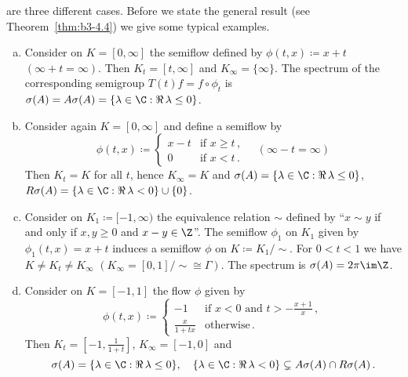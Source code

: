 %
are three different cases. 
Before we state the general result (see Theorem~\ref{thm:b3-4.4}) we give some typical examples.
\begin{examples}\label{ex:b3-4.3}
	\begin{enumerate}[(a), wide]
	\item 
	Consider on $K = [0,\infty]$ the semiflow defined by $\phi(t,x) \coloneq x + t$ $(\infty + t = \infty)$.
	Then $K_{t} = [t,\infty]$ and $K_{\infty} = \{\infty\}$.
	The spectrum of the corresponding semigroup $T(t)f = f\circ\phi_{t}$ is $\sigma(A) = A\sigma(A) = \{\lambda \in \C : \Re\,\lambda  \leq 0\}$.
	
	\item 
	Consider again $K = [0,\infty]$ and define a semiflow by
	\[
	\phi(t,x) \coloneq \begin{cases} 
		x - t & \text{if } x \geq t \,,\\
		0 & \text{if } x < t \,.
	\end{cases} \quad (\infty - t = \infty)
	\]
	Then $K_{t} = K$ for all $t$, hence $K_{\infty} = K$ and $\sigma(A) = \{\lambda \in \C : \Re\,\lambda  \leq 0\}$, $R\sigma(A) = \{\lambda \in \C : \Re\,\lambda  < 0\} \cup \{0\}$.
	
	\item 
	Consider on $K_{1} \coloneq [-1,\infty)$ the equivalence relation $\sim$ defined by \enquote{$x \sim y$ if and only if $x,y \geq 0$ and $x - y \in \Z$}.
	The semiflow $\phi_{1}$ on $K_{1}$ given by $\phi_{1}(t,x) = x + t$ induces a semiflow $\phi$ on $K \coloneq K_{1}/{\sim}$.
	For $0 < t < 1$ we have $K \neq K_{t} \neq K_{\infty}$ $(K_{\infty} = [0,1]/{\sim} \cong \Gamma)$.
	The spectrum is $\sigma(A) = 2\pi \im\Z$.
	
	\item 
	Consider on $K = [-1,1]$ the flow $\phi$ given by
	\[
	\phi(t,x)\coloneq \begin{cases}
		-1 & \text{if } x < 0 \text{ and } t > -\frac{x+1}{x} \,, \\
		\frac{x}{1+tx} & \text{otherwise} \,.
	\end{cases}
	\]
	Then $K_{t} = [-1,\frac{1}{1+t}]$, $K_{\infty} = [-1,0]$ and
	\[
	\sigma(A) = \{\lambda \in \C : \Re\,\lambda  \leq 0\},\quad 
	\{\lambda \in \C : \Re\,\lambda  < 0\} \subsetneq A\sigma(A)\cap R\sigma(A)\,.
	\]
	\end{enumerate}
\end{examples}
